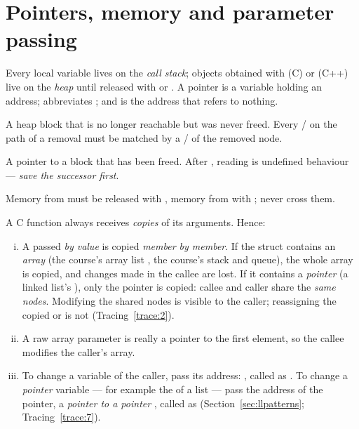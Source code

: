\section{Pointers, memory and parameter passing}

Every local variable lives on the \emph{call stack}; objects obtained with 
(C) or  (C++) live on the \emph{heap} until released with  or
. A pointer is a variable holding an address;  abbreviates
; and  is the address that refers to nothing.

\begin{description}[leftmargin=1.5em]
\item[Memory leak.] A heap block that is no longer reachable but was never freed. Every
  / on the path of a removal must be matched by a /
  of the removed node.
\item[Dangling pointer.] A pointer to a block that has been freed. After ,
  reading  is undefined behaviour --- \emph{save the successor first}.
\item[Mixing.] Memory from  must be released with , memory from
   with ; never cross them.
\end{description}

 A C function always receives
\emph{copies} of its arguments. Hence:
\begin{enumerate}[(i)]
\item A  passed \emph{by value} is copied \emph{member by member}. If the
  struct contains an \emph{array} (the course's array list , the
  course's stack and queue), the whole array is copied, and changes made in the callee
  are lost. If it contains a \emph{pointer} (a linked list's ), only the pointer
  is copied: callee and caller share the \emph{same nodes}. Modifying the shared nodes is
  visible to the caller; reassigning the copied  or  is not
  (Tracing~\ref{trace:2}).
\item A raw array parameter  is really a pointer to the first element, so the
  callee modifies the caller's array.
\item To change a variable of the caller, pass its address: , called
  as . To change a \emph{pointer} variable --- for example the  of a
  list --- pass the address of the pointer, a \emph{pointer to a pointer}
  , called as  (Section~\ref{sec:llpatterns};
  Tracing~\ref{trace:7}).
\end{enumerate}

